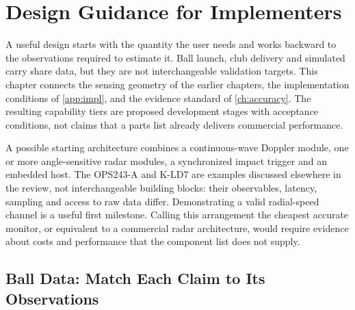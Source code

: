 \chapter{Design Guidance for Implementers}
\label{ch:implications}

A useful design starts with the quantity the user needs and works backward to the observations required to estimate it.
Ball launch, club delivery and simulated carry share data, but they are not interchangeable validation targets.
This chapter connects the sensing geometry of the earlier chapters, the implementation conditions of \cref{app:impl}, and the evidence standard of \cref{ch:accuracy}.
The resulting capability tiers are proposed development stages with acceptance conditions, not claims that a parts list already delivers commercial performance.

A possible starting architecture combines a continuous-wave Doppler module, one or more angle-sensitive radar modules, a synchronized impact trigger and an embedded host.
The OPS243-A and K-LD7 are examples discussed elsewhere in the review, not interchangeable building blocks: their observables, latency, sampling and access to raw data differ.
Demonstrating a valid radial-speed channel is a useful first milestone.
Calling this arrangement the cheapest accurate monitor, or equivalent to a commercial radar architecture, would require evidence about costs and performance that the component list does not supply.

\section{Ball Data: Match Each Claim to Its Observations}

